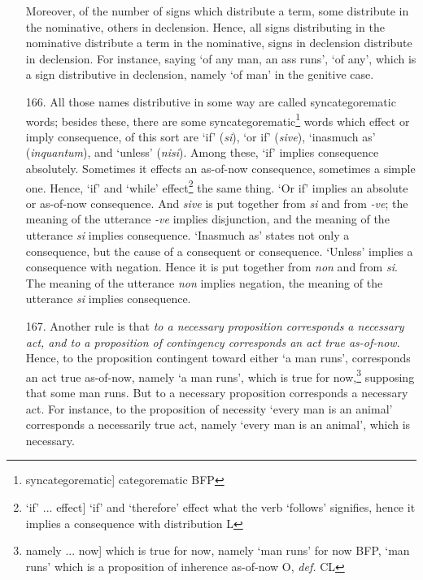 \begin{itemize}
Moreover, of the number of signs which distribute a term, some distribute in the nominative, others in declension. Hence, all signs distributing in the nominative distribute a term in the nominative, signs in declension distribute in declension. For instance, saying `of any man, an ass runs', `of any', which is a sign distributive in declension, namely `of man' in the genitive case.
\item[166.] All those names distributive in some way are called syncategorematic words; besides these, there are some syncategorematic\footnote{syncategorematic] categorematic BFP} words which effect or imply consequence, of this sort are `if' (\textit{si}), `or if' (\textit{sive}), `inasmuch as' (\textit{inquantum}), and `unless' (\textit{nisi}). Among these, `if' implies consequence absolutely. Sometimes it effects an as-of-now consequence, sometimes a simple one. Hence, `if' and `while'  effect\footnote{`if' ... effect] `if' and `therefore' effect what the verb `follows' signifies, hence it implies a consequence with distribution L} the same thing.  `Or if' implies an absolute or as-of-now consequence. And \textit{sive} is put together from \textit{si} and from \textit{-ve}; the meaning of the utterance \textit{-ve} implies disjunction, and the meaning of the utterance \textit{si} implies consequence. `Inasmuch as' states not only a consequence, but the cause of a consequent or consequence. `Unless' implies a consequence with negation. Hence it is put together from \textit{non} and from \textit{si}. The meaning of the utterance \textit{non} implies negation, the meaning of the utterance \textit{si} implies consequence.
\item[167.] Another rule is that \textit{to a necessary proposition corresponds a necessary act, and to a proposition of contingency corresponds an act true as-of-now}. Hence, to the proposition contingent toward either `a man runs', corresponds an act true as-of-now, namely `a man runs', which is true for now,\footnote{namely ... now] which is true for now, namely `man runs' for now BFP, `man runs' which is a proposition of inherence as-of-now O, \textit{def.} CL} supposing that some man runs. But to a necessary proposition corresponds a necessary act. For instance, to the proposition of necessity `every man is an animal' corresponds a necessarily true act, namely `every man is an animal', which is necessary.

\end{itemize}
